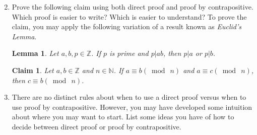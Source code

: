 \documentclass[12 pt]{article}
\newcommand{\Z}{\mathbb{Z}}
\newcommand{\N}{\mathbb{N}}
\theoremstyle{definition}
\theoremstyle{plain}
\theoremstyle{mytheorem}
\newtheorem{lemma}{Lemma}
\newtheorem{claim}{Claim}
\theoremstyle{myexample}
\theoremstyle{mydefinition}
\begin{document}
\begin{enumerate}
\setcounter{enumi}{1}
\item Prove the following claim using both direct proof and proof by contrapositive.  Which proof is easier to write?  Which is easier to understand?  To prove the claim, you may apply the following variation of a result known as \textit{Euclid's Lemma}.

\begin{lemma}  Let $a,b,p \in \Z$.  If $p$ is prime and $p | ab$, then $p|a$ or $p|b$.
\end{lemma}

\begin{claim} Let $a,b \in \Z$ and $n \in \N$.  If $a \equiv b (\bmod \ n)$ and $a \equiv c (\bmod \ n)$, then $c \equiv b (\bmod \ n)$.
\end{claim}

\newpage

\item There are no distinct rules about when to use a direct proof versus when to use proof by contrapositive.  However, you may have developed some intuition about where you may want to start.  List some ideas you have of how to decide between direct proof or proof by contrapositive.
\end{enumerate}
\end{document}
